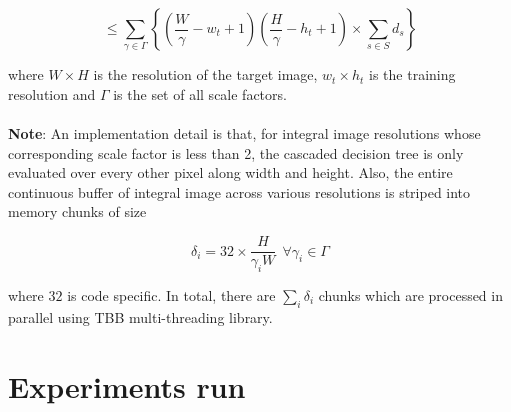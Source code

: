\begin{equation}
\le \sum_{\gamma \in \Gamma} \left \{ \left ( \frac{W}{\gamma} - w_t + 1 \right ) \left ( \frac{H}{\gamma} - h_t + 1  \right ) \times \sum_{s \in S} d_s \right \}
\label{eq10}
\end{equation}

where $W \times H$ is the resolution of the target image, $w_t \times h_t$ is the training resolution and $\Gamma$ is the set of all scale factors. 
\paragraph{}
\textbf{Note}: An implementation detail is that, for integral image resolutions whose corresponding scale factor is less than 2, the cascaded decision tree is only evaluated over every other pixel along width and height. Also, the entire continuous buffer of integral image across various resolutions is striped into memory chunks of size 

\begin{equation}
\delta_i = 32 \times \frac{H}{\gamma_i W} \  \ \forall \gamma_i \in \Gamma
\label{eq11}
\end{equation}


where $32$ is code specific. In total, there are $\sum_i \delta_i$ chunks which are processed in parallel using TBB multi-threading library.


\section{Experiments run}

